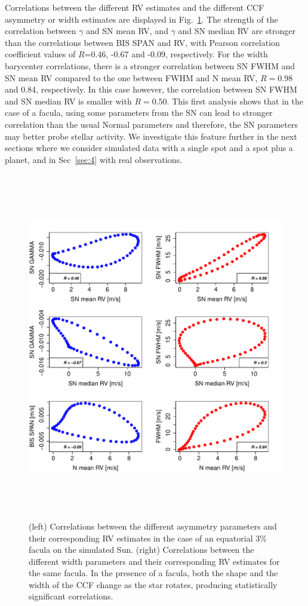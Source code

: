 \documentclass{aa}
\begin{document}
Correlations between the different RV estimates and the different CCF asymmetry or width estimates are displayed in Fig.~\ref{fig:faculae.corr}. The strength of the correlation between $\gamma$ and SN mean RV, and $\gamma$ and SN median RV are stronger than the correlations between BIS SPAN and RV, with Pearson correlation coefficient values of $R$=0.46, -0.67 and -0.09, respectively. For the width barycenter correlations, there is a stronger correlation between SN FWHM and SN mean RV compared to the one between FWHM and N mean RV, $R=0.98$ and 0.84, respectively. In this case however, the correlation between SN FWHM and SN median RV is smaller with $R=0.50$. This first analysis shows that in the case of a facula, using some parameters from the SN can lead to stronger correlation than the usual Normal parameters and therefore, the SN parameters may better probe stellar activity. We investigate this feature further in the next sections where we consider simulated data with a single spot and a spot plus a planet, and in Sec~\ref{sec:4} with real observations.

\begin{figure}[htbp]
\begin{center}
\includegraphics[height = 6in]{SOAP_FACULAE_Comparison_para_SN.pdf} 
   \caption{(left) Correlations between the different asymmetry parameters and their corresponding RV estimates in the case of an equatorial 3\% facula on the simulated Sun. (right) Correlations between the different width parameters and their corresponding RV estimates for the same facula.
   In the presence of a facula, both the shape and the width of the CCF change as the star rotates, producing statistically significant correlations.}
    \label{fig:faculae.corr}
\end{center}
\end{figure}
\end{document}
